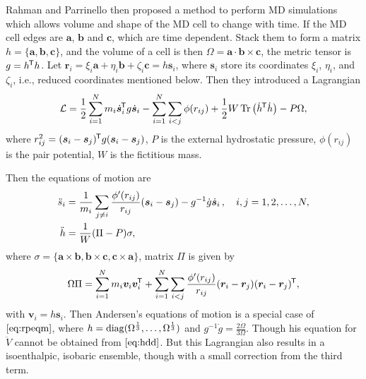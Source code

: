 Rahman and Parrinello then proposed a method to perform
MD simulations which allows volume and shape of the MD cell
to change with time.\cite{Parrinello:1980kx}
If the MD cell edges are $\bm{a}$, $\bm{b}$
and $\bm{c}$, which are time dependent. Stack them to form a
matrix $h = \{ \bm{a}, \bm{b}, \bm{c} \}$, and the volume of a cell
is then $\Omega = \bm{a} \cdot \bm{b} \times \bm{c}$, the metric
tensor is $g = h^{\mkern-1.5mu\mathsf{T}} h$. Let $\bm{r}_i = \xi_i \bm{a} + \eta_i \bm{b}
	+ \zeta_i \bm{c} = h \bm{s}_i$, where $\bm{s}_i$ store its coordinates
$\xi_i$, $\eta_i$, and $\zeta_i$, i.e., reduced coordinates mentioned below.
Then they introduced a Lagrangian
\begin{equation}\label{eq:rplag}
	\mathcal{L} = \frac{ 1 }{ 2 } \sum_{i=1}^{N} m_i \dot{ \bm{s} }_i ^{\mkern-1.5mu\mathsf{T}}
	g \dot{ \bm{s} }_i - \sum_{i=1}^{N} \sum_{i<j} \phi (r_{ij}) +
	\frac{ 1 }{ 2 } W \operatorname{Tr} \big(\dot{h} ^{\mkern-1.5mu\mathsf{T}} \dot{h} \big) - P \Omega,
\end{equation}
where $r_{ij}^2 = (\bm{s}_i - \bm{s}_j)^{\mkern-1.5mu\mathsf{T}} g (\bm{s}_i - \bm{s}_j)$,
$P$ is the external hydrostatic pressure, $\phi(r_{ij})$ is the pair
potential, $W$ is the fictitious mass.

Then the equations of motion are
\begin{subequations}
  \label{eq:rpeqm}
	\begin{align}
		\ddot{s}_i & = \frac{ 1 }{ m_i } \sum_{j\neq i}
		\frac{ \phi'(r_{ij}) }{ r_{ij} } (\bm{s}_i - \bm{s}_j) - g^{-1}\dot{g}
		\dot{ \bm{s} }_i \thinspace, \quad i, j = 1, 2, \ldots, N,\label{eq:rpsdd}\\
		\ddot{h}   & = \frac{ 1 }{ W } (\Pi - P) \sigma, \label{eq:hdd}
	\end{align}
\end{subequations}
where $\sigma = \{\bm{a}\times \bm{b},
	\bm{b}\times \bm{c}, \bm{c}\times \bm{a}\}$,
matrix $\Pi$ is given by
\begin{equation}\label{eq:pim&frr}
	\Omega \Pi = \sum_{i=1}^{N} m_i \bm{v}_i \bm{v}_i^{\mkern-1.5mu\mathsf{T}}
	+ \sum_{i=1}^{N} \sum_{i<j} \frac{ \phi'(r_{ij}) }{ r_{ij} }
	(\bm{r}_i - \bm{r}_j) (\bm{r}_i - \bm{r}_j)^{\mkern-1.5mu\mathsf{T}},
\end{equation}
with $\bm{v}_i = h \bm{s}_i$.
Then Andersen's equations of motion is a special case of
$\eqref{eq:rpeqm}$,
where $h = \operatorname{diag} (\Omega^{\frac{ 1 }{ 3 }}, \ldots,
	\Omega^{\frac{ 1 }{ 3 }})$ and $g^{-1} \dot{g} =
	\frac{ 2 \dot{\Omega} }{3 \Omega }$. Though his equation for
$\ddot{V}$ cannot be obtained from $\eqref{eq:hdd}$. But
this Lagrangian also results in a isoenthalpic, isobaric ensemble,
though with a small correction from the third term.



